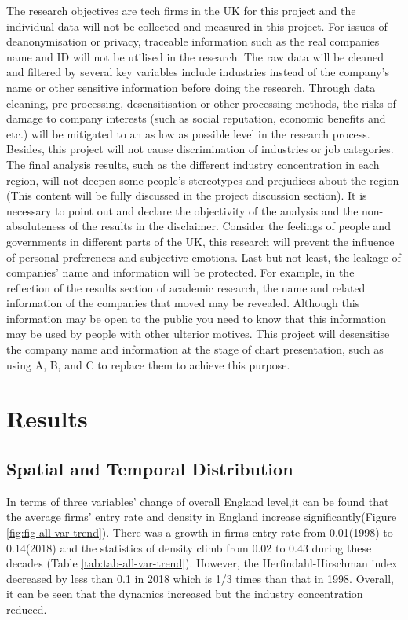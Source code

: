 \documentclass[
  12pt,
  oneside]{book}
\begin{document}
The research objectives are tech firms in the UK for this project and the individual data will not be collected and measured in this project. For issues of deanonymisation or privacy, traceable information such as the real companies name and ID will not be utilised in the research. The raw data will be cleaned and filtered by several key variables include industries instead of the company's name or other sensitive information before doing the research. Through data cleaning, pre-processing, desensitisation or other processing methods, the risks of damage to company interests (such as social reputation, economic benefits and etc.) will be mitigated to an as low as possible level in the research process. Besides, this project will not cause discrimination of industries or job categories. The final analysis results, such as the different industry concentration in each region, will not deepen some people's stereotypes and prejudices about the region (This content will be fully discussed in the project discussion section). It is necessary to point out and declare the objectivity of the analysis and the non-absoluteness of the results in the disclaimer. Consider the feelings of people and governments in different parts of the UK, this research will prevent the influence of personal preferences and subjective emotions. Last but not least, the leakage of companies' name and information will be protected. For example, in the reflection of the results section of academic research, the name and related information of the companies that moved may be revealed. Although this information may be open to the public you need to know that this information may be used by people with other ulterior motives. This project will desensitise the company name and information at the stage of chart presentation, such as using A, B, and C to replace them to achieve this purpose.

\hypertarget{results}{%
\chapter{Results}\label{results}}

\hypertarget{spatial-and-temporal-distribution}{%
\section{Spatial and Temporal Distribution}\label{spatial-and-temporal-distribution}}

In terms of three variables' change of overall England level,it can be found that the average firms' entry rate and density in England increase significantly(Figure \ref{fig:fig-all-var-trend}). There was a growth in firms entry rate from 0.01(1998) to 0.14(2018) and the statistics of density climb from 0.02 to 0.43 during these decades (Table \ref{tab:tab-all-var-trend}). However, the Herfindahl-Hirschman index decreased by less than 0.1 in 2018 which is 1/3 times than that in 1998. Overall, it can be seen that the dynamics increased but the industry concentration reduced.
\end{document}
